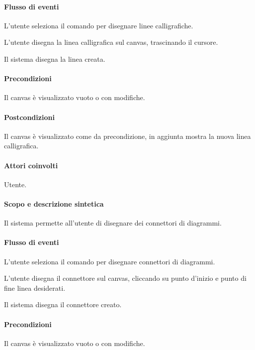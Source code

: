\paragraph{Flusso di eventi}
\begin{elenconumerato}[\textbf{}]{\subsubsecindent}
\item L'utente seleziona il comando per disegnare linee calligrafiche.
\item L'utente disegna la linea calligrafica sul canvas, trascinando il cursore.
\item Il sistema disegna la linea creata.
\end{elenconumerato}
\paragraph{Precondizioni} Il canvas \`e visualizzato vuoto o con modifiche.
\paragraph{Postcondizioni} Il canvas \`e visualizzato come da precondizione, in aggiunta mostra la nuova linea calligrafica.

\paragraph{Attori coinvolti} Utente.
\paragraph{Scopo e descrizione sintetica} 
Il sistema permette all'utente di disegnare dei connettori di diagrammi.
\paragraph{Flusso di eventi}
\begin{elenconumerato}[\textbf{}]{\subsubsecindent}
\item L'utente seleziona il comando per disegnare connettori di diagrammi.
\item L'utente disegna il connettore sul canvas, cliccando su punto d'inizio e punto di fine linea desiderati.
\item Il sistema disegna il connettore creato.
\end{elenconumerato}
\paragraph{Precondizioni} Il canvas \`e visualizzato vuoto o con modifiche.
